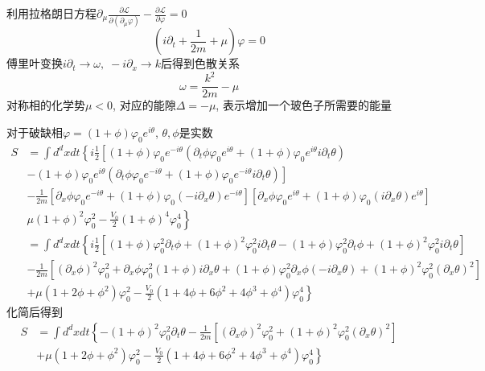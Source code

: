 \documentclass[a4paper,11pt]{article}
\begin{document}
利用拉格朗日方程$\partial_\mu\frac{\partial\mathcal{L}}{\partial(\partial_\mu\varphi)}-\frac{\partial\mathcal{L}}{\partial\varphi}=0$
\begin{equation*}
  (i\partial_t+\frac{1}{2m}+\mu)\varphi=0
\end{equation*}
傅里叶变换$i\partial_t\to\omega,\;-i\partial_x\to k$后得到色散关系
\begin{equation*}
  \omega=\frac{k^2}{2m}-\mu
\end{equation*}
对称相的化学势$\mu<0$, 对应的能隙$\Delta=-\mu$, 表示增加一个玻色子所需要的能量

对于破缺相$\varphi=(1+\phi)\varphi_0e^{i\theta}$, $\theta,\phi$是实数
\begin{equation*}
  \begin{split}
     S&=\int d^dxdt\left\{i\frac{1}{2}\left[(1+\phi)\varphi_0e^{-i\theta}\left(\partial_t\phi\varphi_0e^{i\theta}+(1+\phi)\varphi_0e^{i\theta}i\partial_t\theta\right)\right.\right.\\
     &\left.-(1+\phi)\varphi_0e^{i\theta}\left(\partial_t\phi\varphi_0e^{-i\theta}+(1+\phi)\varphi_0e^{-i\theta}i\partial_t\theta\right)\right]\\
       &-\frac{1}{2m}\left[\partial_x\phi\varphi_0e^{-i\theta}+(1+\phi)\varphi_0(-i\partial_x\theta)e^{-i\theta}\right]\left[\partial_x\phi\varphi_0e^{i\theta}+(1+\phi)\varphi_0(i\partial_x\theta)e^{i\theta}\right]\\
       &\left.\mu(1+\phi)^2\varphi_0^2-\frac{V_0}{2}(1+\phi)^4\varphi_0^4\right\}\\
       &=\int d^dxdt\left\{i\frac{1}{2}\left[(1+\phi)\varphi_0^2\partial_t\phi+(1+\phi)^2\varphi_0^2i\partial_t\theta-(1+\phi)\varphi_0^2\partial_t\phi+(1+\phi)^2\varphi_0^2i\partial_t\theta\right]\right.\\
       &-\frac{1}{2m}\left[(\partial_x\phi)^2\varphi_0^2+\partial_x\phi\varphi_0^2(1+\phi)i\partial_x\theta+(1+\phi)\varphi_0^2\partial_x\phi(-i\partial_x\theta)+(1+\phi)^2\varphi_0^2(\partial_x\theta)^2\right]\\
       &\left.+\mu(1+2\phi+\phi^2)\varphi_0^2-\frac{V_0}{2}(1+4\phi+6\phi^2+4\phi^3+\phi^4)\varphi_0^4\right\}
  \end{split}
\end{equation*}
化简后得到
\begin{equation*}
  \begin{split}
     S&=\int d^dxdt\left\{-(1+\phi)^2\varphi_0^2\partial_t\theta-\frac{1}{2m}\left[(\partial_x\phi)^2\varphi_0^2+(1+\phi)^2\varphi_0^2(\partial_x\theta)^2\right]\right.\\
       &\left.+\mu(1+2\phi+\phi^2)\varphi_0^2-\frac{V_0}{2}(1+4\phi+6\phi^2+4\phi^3+\phi^4)\varphi_0^4\right\}
  \end{split}
\end{equation*}
\end{document}
